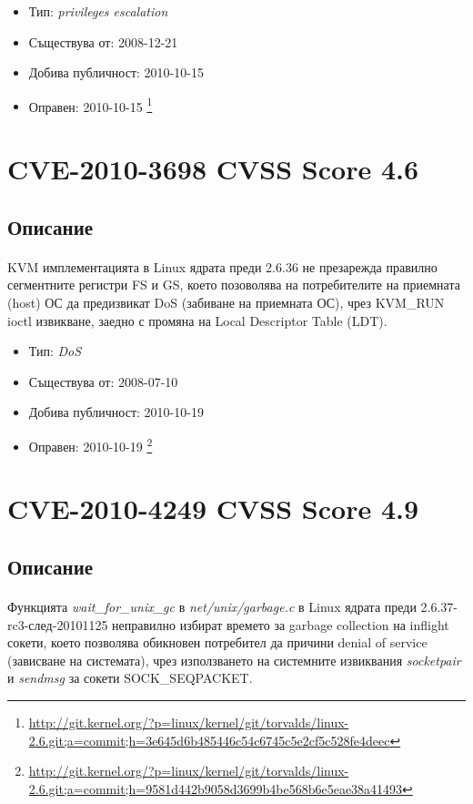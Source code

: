 \documentclass[a4paper,12pt,leqno]{article}
\begin{document}
\begin{itemize}
    \item Тип: \textit{privileges escalation}
    \item Съществува от: 2008-12-21
  	\item Добива публичност: 2010-10-15
    \item Оправен: 2010-10-15 \footnote{\url{http://git.kernel.org/?p=linux/kernel/git/torvalds/linux-2.6.git;a=commit;h=3e645d6b485446c54c6745c5e2cf5c528fe4deec}}
\end{itemize}



\section{CVE-2010-3698 CVSS Score 4.6}
\subsection{Описание}
\paragraph{}
KVM имплементацията в Linux ядрата преди 2.6.36 не презарежда правилно сегментните регистри FS и GS, което позоволява на потребителите на приемната (host) ОС да предизвикат DoS (забиване на приемната ОС), чрез KVM\_RUN ioctl извикване, заедно с промяна на Local Descriptor Table (LDT).

\begin{itemize}
    \item Тип: \textit{DoS}
    \item Съществува от: 2008-07-10
  	\item Добива публичност: 2010-10-19
    \item Оправен: 2010-10-19 \footnote{\url{http://git.kernel.org/?p=linux/kernel/git/torvalds/linux-2.6.git;a=commit;h=9581d442b9058d3699b4be568b6e5eae38a41493}}
\end{itemize}


\section{CVE-2010-4249 CVSS Score 4.9}
\subsection{Описание}
\paragraph{}
Функцията \textit{wait\_for\_unix\_gc} в \textit{net/unix/garbage.c} в Linux ядрата преди 2.6.37-rc3-след-20101125 неправилно избират времето за garbage collection на inflight сокети, което позволява обикновен потребител да причини denial of service (зависване на системата), чрез използването на системните извиквания \textit{socketpair} и \textit{sendmsg} за сокети SOCK\_SEQPACKET.
\end{document}
